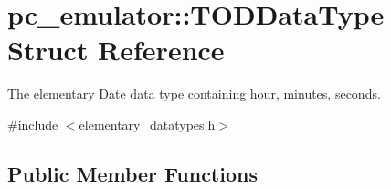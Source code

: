 \hypertarget{structpc__emulator_1_1TODDataType}{}\section{pc\+\_\+emulator\+:\+:T\+O\+D\+Data\+Type Struct Reference}
\label{structpc__emulator_1_1TODDataType}


The elementary Date data type containing hour, minutes, seconds.  




{\ttfamily \#include $<$elementary\+\_\+datatypes.\+h$>$}

\subsection*{Public Member Functions}
